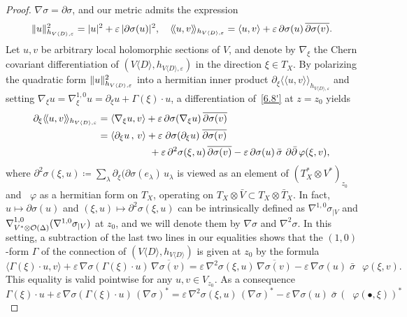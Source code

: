 \documentclass[AHL,Unicode,longabstracts,published]{cedram}
\DeclareMathOperator{\ddbar}{\partial\bar\partial}
\DeclarePairedDelimiter{\abs}{\lvert}{\rvert}
\DeclarePairedDelimiter{\Abs}{\lVert}{\rVert}
\newcommand*\cO{\mathcal{O}}
\newcommand*\bydef{\coloneqq}
\begin{document}
\begin{proof}
$\nabla\sigma=\partial\sigma$, and our metric admits the expression
\[
\Abs{u}_{h_{V\langle D\rangle,\varepsilon}}^2=
\abs{u}^2+\varepsilon\,\abs{\partial\sigma(u)}^2,\quad
\langle\!\langle u,v\rangle\!\rangle_{h_{V\langle D\rangle,\varepsilon}}=
\langle u,v\rangle+\varepsilon\,\partial\sigma(u)\,
\overline{\partial\sigma(v)}.
\]
Let $u,v$ be arbitrary local holomorphic sections of $V$, and denote by
$\nabla_\xi$ the Chern covariant differentiation of $(V\langle D\rangle,h_{V\langle D\rangle,\varepsilon})$ in the direction
$\xi\in T_X$. By polarizing the quadratic form
$\Abs{u}_{h_{V\langle D\rangle,\varepsilon}}^2$ into a hermitian inner product
$\partial_\xi\langle\!\langle u,v
\rangle\!\rangle_{h_{V\langle D\rangle,\varepsilon}}$ and setting $\nabla_\xi u=
\nabla^{1,0}_\xi u=\partial_\xi u+\Gamma(\xi)\cdot u$, a differentiation of~\eqref{6.8'} at $z=z_0$ yields
\begin{align*}
\partial_\xi\langle\!\langle u,v
\rangle\!\rangle_{h_{V\langle D\rangle,\varepsilon}} &=
\langle\nabla_\xi u,v\rangle+\varepsilon\,
\partial\sigma(\nabla_\xi u)\,\overline{\partial\sigma(v)}
\\
&=
\langle\partial_\xi u\,,\,v\rangle+\varepsilon\;
\partial\sigma(\partial_\xi u)\;\overline{\partial\sigma(v)}
\\
&\phantom{=}\hspace{3\parindent} +\varepsilon\,\partial^2\sigma(\xi,u)\,\overline{\partial\sigma(v)} -\varepsilon\,
\partial\sigma(u)\,\bar \sigma\,\ddbar\varphi(\xi,v),
\end{align*}
where $\partial^2\sigma(\xi,u)\bydef\sum_\lambda\partial_\xi(\partial\sigma (e_\lambda)\,u_\lambda$ is viewed as an element of
$(T_X^*\otimes V^*)_{z_0}$ and $\ddbar\varphi$ as a hermitian form on $T_X$, operating on $T_X\otimes\bar V\subset T_X\otimes \bar T_X$. In fact,
$u\mapsto\partial\sigma(u)$ and $(\xi,u)\mapsto\partial^2\sigma(\xi,u)$ can be intrinsically defined as $\nabla^{1,0}\sigma_{|V}$ and
$\smash{\nabla_{V^*\otimes \cO(\Delta)}^{1,0}}(\nabla^{1,0}\sigma_{|V})$ at $z_0$, and we will denote them by $\nabla\sigma$ and $\nabla^2\sigma$. In this setting, a subtraction of the last two lines in our equalities shows that the $(1,0)$-form $\Gamma$ of the connection of $(V\langle D\rangle,h_{V\langle D\rangle})$ is given at $z_0$ by the formula
\begin{equation}\label{6.10}
\langle \Gamma(\xi)\cdot u,v\rangle +\varepsilon\,
\nabla\sigma(\Gamma(\xi)\cdot u)\,\overline{\nabla\sigma(v)} =\varepsilon\,
\nabla^2\sigma(\xi,u)\,\overline{\nabla\sigma(v)} -\varepsilon\,\nabla\sigma(u)\;\bar\sigma\,\ddbar\varphi(\xi,v).
\end{equation}
This equality is valid pointwise for any $u,v\in V_{z_0}$. As a consequence
\begin{equation}\label{6.11}
\Gamma(\xi)\cdot u+\varepsilon\,
\nabla\sigma(\Gamma(\xi)\cdot u)\,(\nabla\sigma)^* =\varepsilon\,
\nabla^2\sigma(\xi,u)\,(\nabla\sigma)^* -\varepsilon\,\nabla\sigma(u)\;\bar\sigma\, (\ddbar\varphi(\bullet,\xi))^*
\end{equation}


\end{proof}
\end{document}
